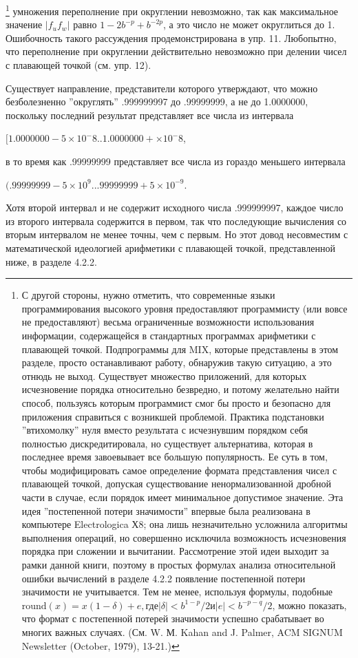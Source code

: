 \begin{enumerate}
\footnote{С другой стороны, нужно отметить, что современные языки программирования высокого уровня предоставляют программисту (или вовсе не предоставляют) весьма ограниченные возможности использования информации, содержащейся в стандартных программах арифметики с плавающей точкой. Подпрограммы для MIX, которые представлены в этом разделе, просто останавливают работу, обнаружив такую ситуацию, а это отнюдь не выход. Существует множество приложений, для которых исчезновение порядка относительно безвредно, и потому желательно найти способ, пользуясь которым программист смог бы просто и безопасно для приложения справиться с возникшей проблемой. Практика подстановки ''втихомолку'' нуля вместо результата с исчезнувшим порядком себя полностью дискредитировала, но существует альтернатива, которая в последнее время завоевывает все большую популярность. Ее суть в том, чтобы модифицировать самое определение формата представления чисел с плавающей точкой, допуская существование ненормализованной дробной части в случае, если порядок имеет минимальное допустимое значение. Эта идея ''постепенной потери значимости'' впервые была реализована в компьютере Electrologica Х8; она лишь незначительно усложнила алгоритмы выполнения операций, но совершенно исключила возможность исчезновения порядка при сложении и вычитании. Рассмотрение этой идеи выходит за рамки данной книги, поэтому в простых формулах анализа относительной ошибки вычислений в разделе 4.2.2 появление постепенной потери значимости не учитывается. Тем не менее, используя формулы, подобные $\text{round}(x)= x(1 - \delta) + e, \text{где} |\delta | < b^{1-p}/2 \text{и} |e| < b^{-p-q}/2$, можно показать, что формат с постепенной потерей значимости успешно срабатывает во многих важных случаях. (См. W. М. Kahan and J. Palmer, ACM SIGNUM Newsletter (October, 1979), 13-21.)}
умножения переполнение при округлении невозможно, так как максимальное значение $|f_{u}f_{w}|$ равно $1- 2b^{-p} + b^{-2p}$, а это число не может округлиться до 1. Ошибочность такого рассуждения продемонстрирована в упр. 11. Любопытно, что переполнение при округлении действительно невозможно при делении чисел с плавающей точкой (см. упр. 12).

Существует направление, представители которого утверждают, что можно безболезненно ''округлять'' .999999997 до .99999999, а не до 1.0000000, поскольку последний результат представляет все числа из интервала
\begin{center}
$[1.0000000 - 5 \times 10^-8 .. 1.0000000 + \times 10^-8$,
\end{center}
в то время как .99999999 представляет все числа из гораздо меньшего интервала
\begin{center} 
$(.99999999 - 5 \times 10^{9} .. .99999999 + 5 \times 10^{-9}$.
\end{center}
Хотя второй интервал и не содержит исходного числа .999999997, каждое число из второго интервала содержится в первом, так что последующие вычисления со вторым интервалом не менее точны, чем с первым. Но этот довод несовместим с математической идеологией арифметики с плавающей точкой, представленной ниже, в разделе 4.2.2.
 

\end{enumerate}
